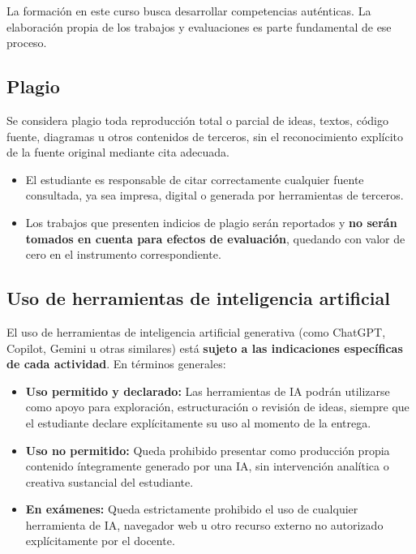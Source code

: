\documentclass[12pt]{article}
\begin{document}
	La formación en este curso busca desarrollar competencias auténticas. La elaboración propia de los trabajos y evaluaciones es parte fundamental de ese proceso.
	
	\subsection*{Plagio}
	
	Se considera plagio toda reproducción total o parcial de ideas, textos, código fuente, diagramas u otros contenidos de terceros, sin el reconocimiento explícito de la fuente original mediante cita adecuada.
	
	\begin{itemize}
		\item El estudiante es responsable de citar correctamente cualquier fuente consultada, ya sea impresa, digital o generada por herramientas de terceros.
		\item Los trabajos que presenten indicios de plagio serán reportados y \textbf{no serán tomados en cuenta para efectos de evaluación}, quedando con valor de cero en el instrumento correspondiente.
	\end{itemize}
	
	\subsection*{Uso de herramientas de inteligencia artificial}
	
	El uso de herramientas de inteligencia artificial generativa (como ChatGPT, Copilot, Gemini u otras similares) está \textbf{sujeto a las indicaciones específicas de cada actividad}. En términos generales:
	
	\begin{itemize}
		\item \textbf{Uso permitido y declarado:} Las herramientas de IA podrán utilizarse como apoyo para exploración, estructuración o revisión de ideas, siempre que el estudiante declare explícitamente su uso al momento de la entrega.
		\item \textbf{Uso no permitido:} Queda prohibido presentar como producción propia contenido íntegramente generado por una IA, sin intervención analítica o creativa sustancial del estudiante.
		\item \textbf{En exámenes:} Queda estrictamente prohibido el uso de cualquier herramienta de IA, navegador web u otro recurso externo no autorizado explícitamente por el docente.
	\end{itemize}
	
\end{document}
